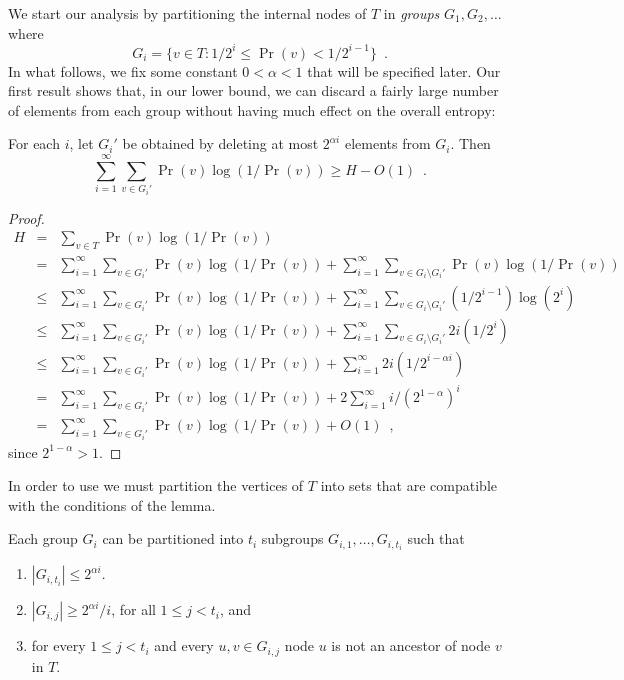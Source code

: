 \documentclass[charterfonts,lotsofwhite]{patmorin}
\begin{document}
We start our analysis by partitioning the internal nodes of $T$ in
\emph{groups} $G_1,G_2,\ldots$ where
\[
	G_i = \{v\in T : 1/2^{i} \le \Pr(v) < 1/2^{i-1} \} \enspace .
\]
In what follows, we fix some constant $0< \alpha < 1$ that will be
specified later.  Our first
result shows that, in our lower bound, we can discard a fairly large
number of elements from each group without having much effect on the
overall entropy:

\begin{lem}
For each $i$, let $G_i'$ be obtained by deleting at most $2^{\alpha
i}$ elements from $G_i$.  Then
\[
    \sum_{i=1}^\infty \sum_{v\in G_i'} \Pr(v)\log(1/\Pr(v)) \ge H-O(1)
	\enspace .
\]
\end{lem}

\begin{proof}
\begin{eqnarray*}
   H & = & \sum_{v\in T} \Pr(v)\log(1/\Pr(v)) \\
   & = & \sum_{i=1}^{\infty}\sum_{v\in G_i'} \Pr(v)\log (1/\Pr(v)) +
         \sum_{i=1}^{\infty}\sum_{v\in G_i\setminus G_i'} \Pr(v)\log (1/\Pr(v)) \\
   & \le & \sum_{i=1}^{\infty}\sum_{v\in G_i'} \Pr(v)\log (1/\Pr(v)) +
         \sum_{i=1}^{\infty}\sum_{v\in G_i\setminus G_i'} (1/2^{i-1})\log (2^i) \\
   & \le & \sum_{i=1}^{\infty}\sum_{v\in G_i'} \Pr(v)\log (1/\Pr(v)) +
         \sum_{i=1}^{\infty}\sum_{v\in G_i\setminus G_i'} 2i(1/2^{i}) \\
   & \le & \sum_{i=1}^{\infty}\sum_{v\in G_i'} \Pr(v)\log (1/\Pr(v)) +
         \sum_{i=1}^{\infty} 2i(1/2^{i-\alpha i}) \\
   & = & \sum_{i=1}^{\infty}\sum_{v\in G_i'} \Pr(v)\log (1/\Pr(v)) +
         2\sum_{i=1}^{\infty} i/(2^{1-\alpha})^{i} \\
   & = & \sum_{i=1}^{\infty}\sum_{v\in G_i'} \Pr(v)\log (1/\Pr(v)) + O(1)
	\enspace ,
\end{eqnarray*}
since $2^{1-\alpha} > 1$.
\end{proof}

In order to use  we must partition the vertices of
$T$ into sets that are compatible with the conditions of the lemma.

\begin{lem}
Each group $G_i$ can be partitioned into $t_i$ subgroups
$G_{i,1},\ldots,G_{i,t_i}$ such that
\begin{enumerate}
\item $|G_{i,t_i}|\le 2^{\alpha i}$.

\item $|G_{i,j}| \ge 2^{\alpha i} / i$, for all $1\le j< t_i$, and

\item for every $1\le j< t_i$ and every $u,v\in G_{i,j}$ node $u$ is
not an ancestor of node $v$ in $T$. 

\end{enumerate}
\end{lem}
\end{document}
